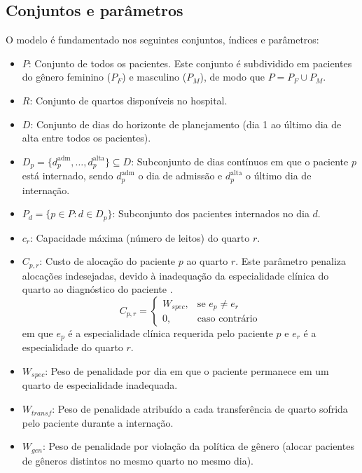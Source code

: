 \subsection{Conjuntos e parâmetros}
O modelo é fundamentado nos seguintes conjuntos, índices e parâmetros:
\begin{itemize}
    \item $P$: Conjunto de todos os pacientes. Este conjunto é subdividido em pacientes do gênero feminino ($P_F$) e masculino ($P_M$), de modo que $P = P_F \cup P_M$.
    \item $R$: Conjunto de quartos disponíveis no hospital.
    \item $D$: Conjunto de dias do horizonte de planejamento (dia 1 ao último dia de alta entre todos os pacientes).
    \item $D_p = \{d^{\text{adm}}_p, \dots, d^{\text{alta}}_p\} \subseteq D$: Subconjunto de dias contínuos em que o paciente $p$ está internado, sendo $d^{\text{adm}}_p$ o dia de admissão e $d^{\text{alta}}_p$ o último dia de internação.
    \item $P_d = \{p \in P : d \in D_p\}$: Subconjunto dos pacientes internados no dia $d$.
    \item $c_r$: Capacidade máxima (número de leitos) do quarto $r$.
    \item $C_{p,r}$: Custo de alocação do paciente $p$ ao quarto $r$. Este parâmetro penaliza alocações indesejadas, devido à inadequação da especialidade clínica do quarto ao diagnóstico do paciente \cite{ceschia2011local}.
    \begin{equation}
        C_{p,r} = \begin{cases} W_{spec}, & \text{se } e_p \neq e_r \\ 0, & \text{caso contrário} \end{cases}
    \end{equation}
    em que $e_p$ é a especialidade clínica requerida pelo paciente $p$ e $e_r$ é a especialidade do quarto $r$.
    \item $W_{spec}$: Peso de penalidade por dia em que o paciente permanece em um quarto de especialidade inadequada.
    \item $W_{transf}$: Peso de penalidade atribuído a cada transferência de quarto sofrida pelo paciente durante a internação.
    \item $W_{gen}$: Peso de penalidade por violação da política de gênero (alocar pacientes de gêneros distintos no mesmo quarto no mesmo dia).
\end{itemize}

